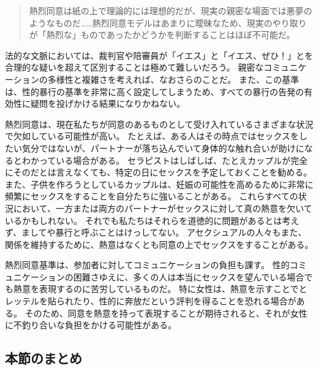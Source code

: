 \documentclass[paper=a4,book,openany]{jlreq}
\begin{document}
\begin{quote}
熱烈同意は紙の上で理論的には理想的だが、現実の親密な場面では悪夢のようなものだ……熱烈同意モデルはあまりに曖昧なため、現実のやり取りが「熱烈な」ものであったかどうかを判断することはほぼ不可能だ。
\citep{zheng14:_how_ace_sex}

\end{quote}

法的な文脈においては、裁判官や陪審員が「イエス」と「イエス、ぜひ！」とを合理的な疑いを超えて区別することは極めて難しいだろう。
親密なコミュニケーションの多様性と複雑さを考えれば、なおさらのことだ。
また、この基準は、性的暴行の基準を非常に高く設定してしまうため、すべての暴行の告発の有効性に疑問を投げかける結果になりかねない。

熱烈同意は、現在私たちが同意のあるものとして受け入れているさまざまな状況で欠如している可能性が高い。
たとえば、ある人はその時点ではセックスをしたい気分ではないが、パートナーが落ち込んでいて身体的な触れ合いが助けになるとわかっている場合がある。
セラピストはしばしば、たとえカップルが完全にそのだとは言えなくても、特定の日にセックスを予定しておくことを勧める。
また、子供を作ろうとしているカップルは、妊娠の可能性を高めるために非常に頻繁にセックスをすることを自分たちに強いることがある。
これらすべての状況において、一方または両方のパートナーがセックスに対して真の熱意を欠いているかもしれない。
それでも私たちはそれらを道徳的に問題があるとは考えず、ましてや暴行と呼ぶことはけっしてない。
アセクシュアルの人々もまた、関係を維持するために、熱意はなくとも同意の上でセックスをすることがある。

熱烈同意基準は、参加者に対してコミュニケーションの負担も課す。
性的コミュニケーションの困難さゆえに、多くの人は本当にセックスを望んでいる場合でも熱意を表現するのに苦労しているものだ。
特に女性は、熱意を示すことでとレッテルを貼られたり、性的に奔放だという評判を得ることを恐れる場合がある。
そのため、同意を熱意を持って表現することが期待されると、それが女性に不釣り合いな負担をかける可能性がある。

\subsection{本節のまとめ}
\end{document}
